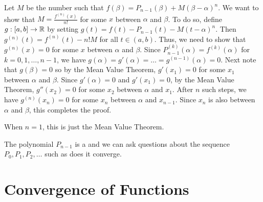 \documentclass{mathnotes}
\begin{document}
\begin{pf}
  Let $M$ be the number such that $f(\beta)=P_{n-1}(\beta)+M(\beta-\alpha)^n$.
  We want to show that $M=\frac{f^{(n)}(x)}{n!}$ for some $x$ between $\alpha$
  and $\beta$. To do so, define $g:[a,b]\to\mathbb{R}$ by setting
  $g(t)=f(t)-P_{n-1}(t)-M(t-\alpha)^n$. Then $g^{(n)}(t)=f^{(n)}(t)-n!M$ for
  all $t\in(a,b)$. Thus, we need to show that $g^{(n)}(x)=0$ for some $x$
  between $\alpha$ and $\beta$. Since $P_{n-1}^{(k)}(\alpha)=f^{(k)}(\alpha)$
  for $k=0,1,\ldots,n-1$, we have
  $g(\alpha)=g'(\alpha)=\ldots=g^{(n-1)}(\alpha)=0$. Next note that
  $g(\beta)=0$ so by the Mean Value Theorem, $g'(x_1)=0$ for some $x_1$ between
  $\alpha$ and $\beta$. Since $g'(\alpha)=0$ and $g'(x_1)=0$, by the Mean Value
  Theorem, $g''(x_2)=0$ for some $x_2$ between $\alpha$ and $x_1$. After $n$
  such steps, we have $g^{(n)}(x_n)=0$ for some $x_n$ between $\alpha$ and
  $x_{n-1}$. Since $x_n$ is also between $\alpha$ and $\beta$, this completes
  the proof.
\end{pf}

\begin{note}
  When $n=1$, this is just the Mean Value Theorem.
\end{note}

\begin{note}
  The polynomial $P_{n-1}$ is a  and we can ask
  questions about the sequence $P_0,P_1,P_2,\ldots$ such as does it converge.
\end{note}

\section*{Convergence of Functions}
\end{document}
